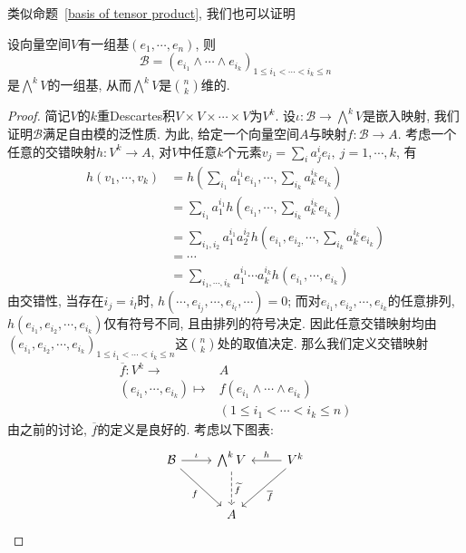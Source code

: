 类似命题~\ref{basis of tensor product}, 我们也可以证明
\begin{prop}\label{basis of exterior}
    设向量空间$V$有一组基$(e_1,\cdots,e_n)$, 则
    \[\mathcal{B}=(e_{i_1}\wedge\cdots\wedge e_{i_k})_{1\leq i_1<\cdots<i_k\leq n}\]
    是$\displaystyle\bigwedge\nolimits^kV$的一组基, 从而$\displaystyle\bigwedge\nolimits^kV$是$\displaystyle\binom{n}{k}$维的.
\end{prop}
\begin{proof}
    简记$V$的$k$重Descartes积$V\times V\times\cdots\times V$为$V^k$.
    设$\iota:\mathcal{B}\to\bigwedge\nolimits^k V$是嵌入映射, 我们证明$\mathcal{B}$满足自由模的泛性质.
    为此, 给定一个向量空间$A$与映射$f:\mathcal{B}\to A$.
    考虑一个任意的交错映射$h:V^k\to A$,
    对$V$中任意$k$个元素$\displaystyle v_j=\sum_{i}a^i_je_i,\ j=1,\cdots,k$, 有
    \begin{align*}
        h(v_1,\cdots,v_k)&=h\left(\sum_{i_1}a^{i_1}_1e_{i_1},\cdots,\sum_{i_k}a^{i_k}_ke_{i_k}\right)\\
        &=\sum_{i_1}a^{i_1}_1h\left(e_{i_1},\cdots,\sum_{i_k}a^{i_k}_ke_{i_k}\right)\\
        &=\sum_{i_1,i_2}a^{i_1}_1a^{i_2}_2h\left(e_{i_1},e_{i_2,}\cdots,\sum_{i_k}a^{i_k}_ke_{i_k}\right)\\
        &=\cdots\\
        &=\sum_{i_1,\cdots,i_k}a^{i_1}_1\cdots a^{i_k}_kh(e_{i_1},\cdots,e_{i_k})
    \end{align*}
    由交错性, 当存在$i_j=i_l$时, $h(\cdots,e_{i_j},\cdots,e_{i_l},\cdots)=0$;
    而对$e_{i_1},e_{i_2},\cdots,e_{i_k}$的任意排列, $h(e_{i_1},e_{i_2},\cdots,e_{i_k})$仅有符号不同, 且由排列的符号决定.
    因此任意交错映射均由$(e_{i_1},e_{i_2},\cdots,e_{i_k})_{1\leq i_1<\cdots<i_k\leq n}$这$\displaystyle\binom{n}{k}$处的取值决定.
    那么我们定义交错映射
    \begin{align*}
        \overline{f}:V^k\to& A\\
        (e_{i_1},\cdots,e_{i_k})\mapsto& f(e_{i_1}\wedge\cdots\wedge e_{i_k})\\
        &{\scriptstyle(1\leq i_1<\cdots<i_k\leq n)}
    \end{align*}
    由之前的讨论, $\overline{f}$的定义是良好的.
    考虑以下图表:
    \[\begin{tikzcd}[row sep=large]
        \mathcal{B} \arrow[r, "\iota"] \arrow[dr, "f"'] & \bigwedge^k V \arrow[d, dashed, "\widetilde{f}"] & V^k \arrow[l, "h"'] \arrow[dl, "\overline{f}"]\\
        & A &
    \end{tikzcd}\]

\end{proof}
